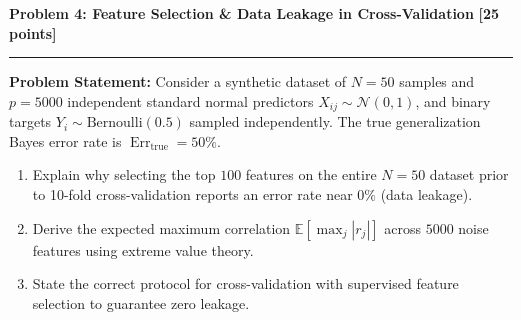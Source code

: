\documentclass[11pt,a4paper]{article}
\newcommand{\problemheader}[2]{%
  \noindent
  \begin{minipage}{\textwidth}
    {\large\bfseries\textcolor{utblue}{#1}}\hfill
    {\large\bfseries\textcolor{utblue}{#2}}\\[3pt]
    \textcolor{utblue}{\rule{\textwidth}{1pt}}
  \end{minipage}%
  \par\vspace{8pt}
}
\begin{document}
\problemheader{Problem 4: Feature Selection \& Data Leakage in Cross-Validation}{[25 points]}

\textbf{Problem Statement:}
Consider a synthetic dataset of $N = 50$ samples and $p = 5000$ independent standard normal predictors $X_{ij} \sim \mathcal{N}(0, 1)$, and binary targets $Y_i \sim \text{Bernoulli}(0.5)$ sampled independently. The true generalization Bayes error rate is $\operatorname{Err}_{\text{true}} = 50\%$.
\begin{enumerate}[label=(\alph*), itemsep=3pt, leftmargin=18pt]
  \item Explain why selecting the top $100$ features on the entire $N=50$ dataset prior to 10-fold cross-validation reports an error rate near $0\%$ (data leakage).
  \item Derive the expected maximum correlation $\mathbb{E}[\max_j |r_j|]$ across $5000$ noise features using extreme value theory.
  \item State the correct protocol for cross-validation with supervised feature selection to guarantee zero leakage.
\end{enumerate}

\vspace{8pt}
\noindent{\large\bfseries\textcolor{utblue}{Solution:}}
\vspace{4pt}
\end{document}
